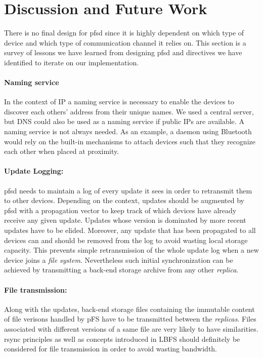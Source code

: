 
\section{Discussion and Future Work}
\label{sec:futwk}

There is no final design for pfsd since it is highly dependent on
which type of device and which type of communication channel it relies
on. This section is a survey of lessons we have learned from designing
pfsd and directives we have identified to iterate on our implementation.

\paragraph {Naming service}
In the context of IP a naming service is necessary to enable the
devices to discover each others' address from their unique names. We
used a central server, but DNS could also be used as a naming service
if public IPs are available. A naming service is not always needed. As
an example, a daemon using Bluetooth would rely on the built-in
mechanisms to attach devices such that they recognize each other when
placed at proximity.

\paragraph {Update Logging:}
pfsd needs to maintain a log of every update it sees in order to
retransmit them to other devices. Depending on the context, updates
should be augmented by pfsd with a propagation vector to keep track of
which devices have already receive any given update. Updates whose
version is dominated by more recent updates have to be
elided. Moreover, any update that has been propagated to all devices
can and should be removed from the log to avoid wasting local storage
capacity. This prevents simple retransmission of the whole update
log when a new device joins a \emph{file system}. Nevertheless such
initial synchronization can be achieved by transmitting a back-end
storage archive from any other \emph{replica}.

\paragraph {File transmission:}
Along with the updates, back-end storage files containing the
immutable content of file verisons handled by pFS have to be
transmitted between the \emph{replicas}. Files associated with
different versions of a same file are very likely to have
similarities. rsync\cite{tridgell:rsync} principles as well as concepts
introduced in LBFS\cite{muthitacharoen:lbfs} should definitely be
considered for file transmission in order to avoid wasting bandwidth.

